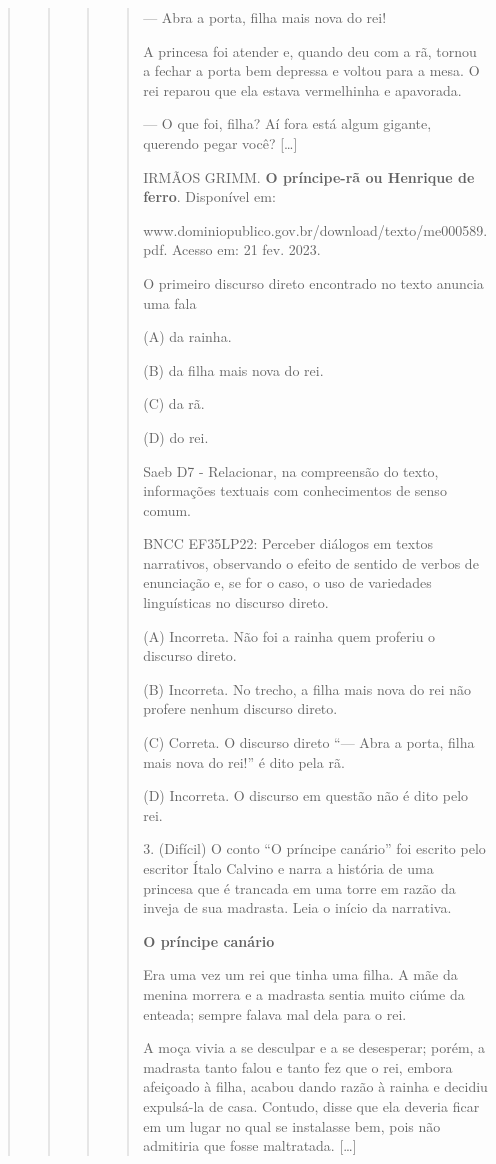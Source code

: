 \begin{quote}
\begin{quote}
\begin{quote}
\begin{quote}
--- Abra a porta, filha mais nova do rei!

A princesa foi atender e, quando deu com a rã, tornou a fechar a porta
bem depressa e voltou para a mesa. O rei reparou que ela estava
vermelhinha e apavorada.

--- O que foi, filha? Aí fora está algum gigante, querendo pegar você?
{[}\ldots{}{]}

IRMÃOS GRIMM. \textbf{O príncipe-rã ou Henrique de ferro}. Disponível
em:

www.dominiopublico.gov.br/download/texto/me000589.pdf. Acesso em: 21
fev. 2023.

O primeiro discurso direto encontrado no texto anuncia uma fala

(A) da rainha.

(B) da filha mais nova do rei.

(C) da rã.

(D) do rei.

Saeb D7 - Relacionar, na compreensão do texto, informações textuais com
conhecimentos de senso comum.

BNCC EF35LP22: Perceber diálogos em textos narrativos, observando o
efeito de sentido de verbos de enunciação e, se for o caso, o uso de
variedades linguísticas no discurso direto.

(A) Incorreta. Não foi a rainha quem proferiu o discurso direto.

(B) Incorreta. No trecho, a filha mais nova do rei não profere nenhum
discurso direto.

(C) Correta. O discurso direto ``--- Abra a porta, filha mais nova do
rei!'' é dito pela rã.

(D) Incorreta. O discurso em questão não é dito pelo rei.

3. (Difícil) O conto ``O príncipe canário'' foi escrito pelo escritor
Ítalo Calvino e narra a história de uma princesa que é trancada em uma
torre em razão da inveja de sua madrasta. Leia o início da narrativa.

\textbf{O príncipe canário}

Era uma vez um rei que tinha uma filha. A mãe da menina morrera e a
madrasta sentia muito ciúme da enteada; sempre falava mal dela para o
rei.

A moça vivia a se desculpar e a se desesperar; porém, a madrasta tanto
falou e tanto fez que o rei, embora afeiçoado à filha, acabou dando
razão à rainha e decidiu expulsá-la de casa. Contudo, disse que ela
deveria ficar em um lugar no qual se instalasse bem, pois não admitiria
que fosse maltratada. {[}\ldots{}{]}


\end{quote}
\end{quote}
\end{quote}
\end{quote}
